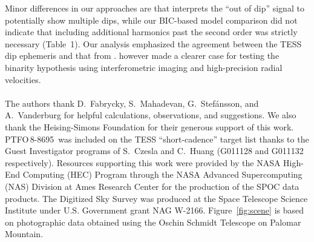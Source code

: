 \documentclass[12pt,twocolumn,tighten]{aastex62}
\newcommand{\ptfo}{PTFO$\,$8-8695}
\begin{document}
Minor differences in our approaches are that \citet{koen_2020}
interprets the ``out of dip'' signal to potentially show multiple
dips, while our BIC-based model comparison did not indicate that
including additional harmonics past the second order was strictly
necessary (Table~1). Our analysis emphasized the agreement between the
TESS dip ephemeris and that from \citet{tanimoto_evidence_2020}.
\citet{koen_2020} however made a clearer case for testing the binarity
hypothesis using interferometric imaging and high-precision radial
velocities.
\\
\\
%
%
%
The authors thank D.~Fabrycky, S.~Mahadevan, G.~Stef\'ansson, and
A.~Vanderburg for helpful calculations, observations, and suggestions.
%
We also thank the Heising-Simons Foundation for
their generous support of this work.
%
\ptfo\ was included on the TESS ``short-cadence'' target list thanks
to the Guest Investigator programs of S.\ Czesla and C.\ Huang
(G011128 and G011132 respectively).
%
Resources supporting this work were provided by the NASA High-End Computing (HEC) Program through the NASA Advanced Supercomputing (NAS) Division at Ames Research Center for the production of the SPOC data products.
%
The Digitized Sky Survey was produced at the Space Telescope Science
Institute under U.S. Government grant NAG W-2166.
Figure~\ref{fig:scene} is based on photographic data obtained using
the Oschin Schmidt Telescope on Palomar Mountain.
%
\end{document}
